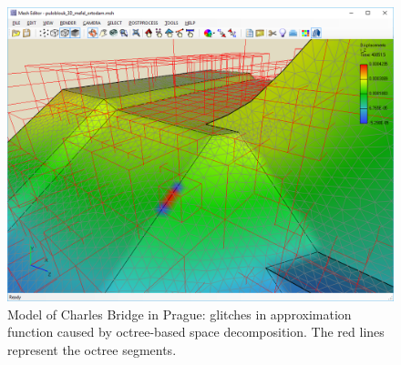 \begin{figure}[H]
  \centering
  \includegraphics[width=\textwidth]{figures/chapter-results/charles-bridge-glitches-in-approximation}
  \decoRule
  \caption[Model of Charles Bridge -- glitches in approximation function]{Model of Charles Bridge in Prague: glitches in approximation function caused by octree-based space decomposition. The red lines represent the octree segments.}
  \label{fig:charles-bridge-glitches-in-approximation}
\end{figure}
